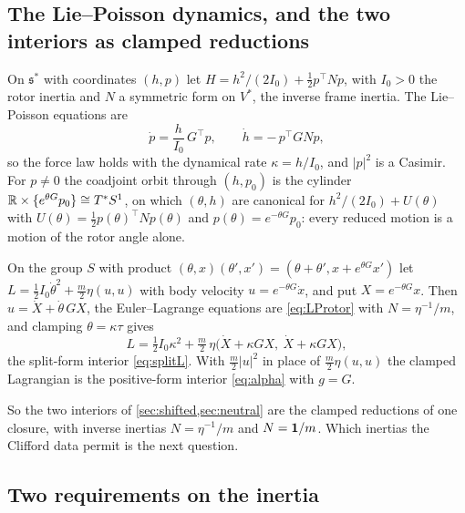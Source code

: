 \subsection{The Lie--Poisson dynamics, and the two interiors as clamped reductions}

\begin{proposition}
\label{prop:LP}
On $\mathfrak s^*$ with coordinates $(h,p)$ let $H=h^2/(2I_0)+\tfrac12p^{\!\top}Np$, with $I_0>0$ the rotor inertia and $N$ a symmetric form on
$V^*$, the inverse frame inertia. The Lie--Poisson equations are
\begin{equation}
\label{eq:LProtor}
\dot p=\frac h{I_0}\,G^{\!\top}p,\qquad \dot h=-\,p^{\!\top}GNp ,
\end{equation}
so the force law holds with the dynamical rate $\kappa=h/I_0$, and $|p|^2$ is a Casimir. For $p\neq0$ the coadjoint orbit through $(h,p_0)$ is the
cylinder $\mathbb{R}\times\{e^{\theta G}p_0\}\cong T^*S^1$, on which $(\theta,h)$ are canonical for $h^2/(2I_0)+U(\theta)$ with
$U(\theta)=\tfrac12p(\theta)^{\!\top}Np(\theta)$ and $p(\theta)=e^{-\theta G}p_0$: every reduced motion is a motion of the rotor angle alone.
\end{proposition}

\begin{proposition}
\label{prop:groupred}
On the group $S$ with product $(\theta,x)(\theta',x')=(\theta+\theta',x+e^{\theta G}x')$ let $L=\tfrac12I_0\dot\theta^2+\tfrac m2\eta(u,u)$ with body velocity
$u=e^{-\theta G}\dot x$, and put $X=e^{-\theta G}x$. Then $u=\dot X+\dot\theta\,GX$, the Euler--Lagrange equations are \eqref{eq:LProtor} with $N=\eta^{-1}/m$,
and clamping $\theta=\kappa\tau$ gives
\[
L=\tfrac12I_0\kappa^2+\tfrac m2\,\eta\bigl(\dot X+\kappa GX,\ \dot X+\kappa GX\bigr),
\]
the split-form interior \eqref{eq:splitL}. With $\tfrac m2|u|^2$ in place of $\tfrac m2\eta(u,u)$ the clamped Lagrangian is the positive-form interior
\eqref{eq:alpha} with $g=G$.
\end{proposition}

So the two interiors of \cref{sec:shifted,sec:neutral} are the clamped reductions of one closure, with inverse inertias $N=\eta^{-1}/m$ and
$N=\mathbf 1/m$. Which inertias the Clifford data permit is the next question.

\subsection{Two requirements on the inertia}

